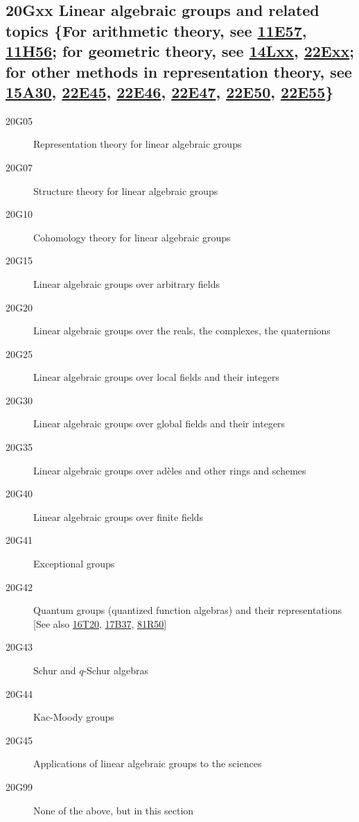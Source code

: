 \documentclass[letterpaper]{article}
\begin{document}
\subsection*{20Gxx  Linear algebraic groups and related topics \{For arithmetic theory, see \hyperref[11E57]{11E57}, \hyperref[11H56]{11H56}; for geometric theory, see \hyperref[14Lxx]{14Lxx}, \hyperref[22Exx]{22Exx}; for other methods in representation theory, see \hyperref[15A30]{15A30}, \hyperref[22E45]{22E45}, \hyperref[22E46]{22E46}, \hyperref[22E47]{22E47}, \hyperref[22E50]{22E50}, \hyperref[22E55]{22E55}\} }\label{20Gxx}
\begin{description}  
\item [20G05]\label{20G05} Representation theory for linear algebraic groups
\item [20G07]\label{20G07} Structure theory for linear algebraic groups
\item [20G10]\label{20G10} Cohomology theory for linear algebraic groups
\item [20G15]\label{20G15} Linear algebraic groups over arbitrary fields
\item [20G20]\label{20G20} Linear algebraic groups over the reals, the complexes, the quaternions
\item [20G25]\label{20G25} Linear algebraic groups over local fields and their integers
\item [20G30]\label{20G30} Linear algebraic groups over global fields and their integers
\item [20G35]\label{20G35} Linear algebraic groups over ad\`{e}les and other rings and schemes
\item [20G40]\label{20G40} Linear algebraic groups over finite fields
\item [20G41]\label{20G41} Exceptional groups
\item [20G42]\label{20G42} Quantum groups (quantized function algebras) and their representations [See also \hyperref[16T20]{16T20}, \hyperref[17B37]{17B37}, \hyperref[81R50]{81R50}]
\item [20G43]\label{20G43} Schur and $q$-Schur algebras
\item [20G44]\label{20G44} Kac-Moody groups
\item [20G45]\label{20G45} Applications of linear algebraic groups to the sciences
\item [20G99]\label{20G99} None of the above, but in this section
\end{description}
\end{document}
